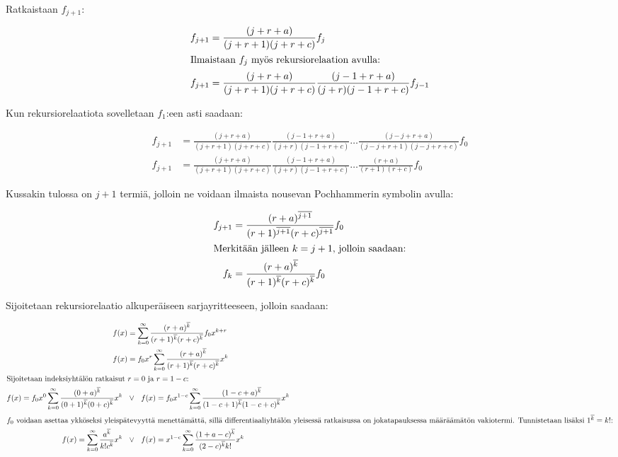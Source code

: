 \documentclass[../johdoksia.tex]{subfiles}
\begin{document}
	\noindent Ratkaistaan $f_{j + 1}$:
	
	\begin{align*}
		f_{j + 1} &= \frac{(j + r + a)}{(j + r + 1)(j + r + c)}f_j \\
		\intertext{Ilmaistaan $f_j$ myös rekursiorelaation avulla:}
		f_{j + 1} &= \frac{(j + r + a)}{(j + r + 1)(j + r + c)}\frac{(j - 1 + r + a)}{(j + r)(j - 1 + r + c)}f_{j - 1}
	\end{align*}

	\noindent Kun rekursiorelaatiota sovelletaan $f_1$:een asti saadaan:
	
	\begin{align*}
		f_{j + 1} &= \frac{(j + r + a)}{(j + r + 1)(j + r + c)}\frac{(j - 1 + r + a)}{(j + r)(j - 1 + r + c)}\dots\frac{(j - j + r + a)}{(j - j + r + 1)(j - j + r + c)}f_{0} \\
		f_{j + 1} &= \frac{(j + r + a)}{(j + r + 1)(j + r + c)}\frac{(j - 1 + r + a)}{(j + r)(j - 1 + r + c)}\dots\frac{(r + a)}{(r + 1)(r + c)}f_{0}
	\end{align*}

	\noindent Kussakin tulossa on $j + 1$ termiä, jolloin ne voidaan ilmaista nousevan Pochhammerin symbolin avulla:
	
	\begin{align*}
		f_{j + 1} &= \frac{(r + a)^{\overline{j + 1}}}{(r + 1)^{\overline{j + 1}}(r + c)^{\overline{j + 1}}}f_0 \\
		\intertext{Merkitään jälleen $k = j + 1$, jolloin saadaan:}
		f_{k} &= \frac{(r + a)^{\overline{k}}}{(r + 1)^{\overline{k}}(r + c)^{\overline{k}}}f_0
	\end{align*}

	\noindent Sijoitetaan rekursiorelaatio alkuperäiseen sarjayritteeseen, jolloin saadaan:
	
	\begin{align*}
		f(x) &= \sum_{k = 0}^{\infty}\frac{(r + a)\risingfact{k}}{(r + 1)\risingfact{k}(r + c)\risingfact{k}}f_0x^{k + r} \\
		f(x) &= f_0x^{r}\sum_{k = 0}^{\infty}\frac{(r + a)\risingfact{k}}{(r + 1)\risingfact{k}(r + c)\risingfact{k}}x^{k} \\
		\intertext{Sijoitetaan indeksiyhtälön ratkaisut $r = 0$ ja $r = 1 - c$:}
		f(x) = f_0x^{0}\sum_{k = 0}^{\infty}\frac{(0 + a)\risingfact{k}}{(0 + 1)\risingfact{k}(0 + c)\risingfact{k}}x^{k} \ \ &\lor \ \ f(x) = f_0x^{1 - c}\sum_{k = 0}^{\infty}\frac{(1 - c + a)\risingfact{k}}{(1 - c + 1)\risingfact{k}(1 - c + c)\risingfact{k}}x^{k} \\
		\intertext{$f_0$ voidaan asettaa ykköseksi yleispätevyyttä menettämättä, sillä differentiaaliyhtälön yleisessä ratkaisussa on jokatapauksessa määräämätön vakiotermi. Tunnistetaan lisäksi $1\risingfact{k} = k!$:}
		f(x) = \sum_{k = 0}^{\infty}\frac{a\risingfact{k}}{k!c\risingfact{k}}x^{k} \ \ &\lor \ \ f(x) = x^{1 - c}\sum_{k = 0}^{\infty}\frac{(1 + a - c)\risingfact{k}}{(2 - c)\risingfact{k}k!}x^{k} \\
	\end{align*}
\end{document}
